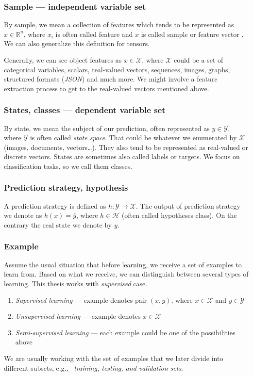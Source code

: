 \subsubsection*{Sample --- independent variable set}
By sample, we mean a collection of features which tends to be represented as $x\in\mathbb{R}^{n}$, where $x_i$ is often called feature and $x$ is called sample or feature vector \cite{GoodBengCour16}. We can also generalize this definition for tensors.

Generally, we can see object features as $x \in \mathcal{X}$, where $\mathcal{X}$ could be a set of categorical variables, scalars, real-valued vectors, sequences, images, graphs, structured formats (\emph{JSON}) and much more. We might involve a feature extraction process to get to the real-valued vectors mentioned above.

\subsubsection*{States, classes --- dependent variable set}
By state, we mean the subject of our prediction, often represented as $y \in \mathcal{Y}$, where $\mathcal{Y}$ is often called \emph{state space}. That could be whatever we enumerated by $\mathcal{X}$ (images, documents, vectors\dots). They also tend to be represented as real-valued or discrete vectors. States are sometimes also called labels or targets. We focus on classification tasks, so we call them classes.

\subsubsection*{Prediction strategy, hypothesis}
A prediction strategy is defined as $h:\mathcal{Y} \rightarrow \mathcal{X}$. The output of prediction strategy we denote as $h(x)=\hat{y}$, where $h\in\mathcal{H}$ (often called hypotheses class). On the contrary the real state we denote by $y$. 

\subsubsection*{Example}
Assume the usual situation that before learning, we receive a set of examples to learn from. Based on what we receive, we can distinguish between several types of learning. This thesis works with \emph{supervised} case.\
\begin{enumerate}
    \itemsep0em 
    \item \emph{Supervised learning} --- example denotes pair $(x,y)$, where $x\in \mathcal{X}$ and $y\in \mathcal{Y}$
    \item \emph{Unsupervised learning} --- example denotes $x\in \mathcal{X}$
    \item \emph{Semi-supervised learning} --- each example could be one of the possibilities above
\end{enumerate}
We are usually working with the set of examples that we later divide into different subsets, e.g., \ \emph{training, testing, and validation sets}. \


